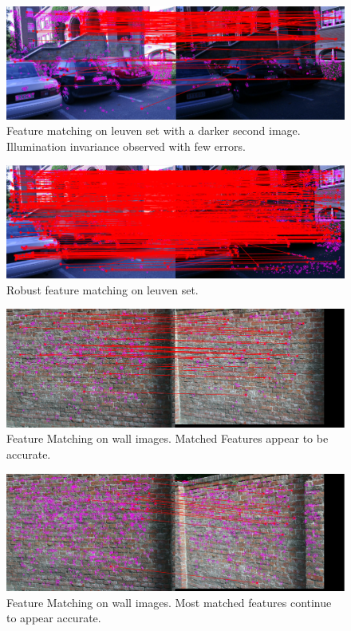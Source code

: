 \documentclass[12pt,journal,compsoc]{IEEEtran}
\begin{document}
\begin{figure}[h]
	\centering
		  \centering
		  \includegraphics[width=1\linewidth]{img/car2}
		  \caption{Feature matching on leuven set with a darker second image. Illumination invariance observed with few errors.}
		  \label{fig:car2}
\end{figure}

\begin{figure}[h]
	\centering
		  \centering
		  \includegraphics[width=1\linewidth]{img/car3}
		  \caption{Robust feature matching on leuven set.}
		  \label{fig:car3}
\end{figure}


\begin{figure}[h]
	\centering
		  \centering
		  \includegraphics[width=1\linewidth]{img/wall1}
		  \caption{Feature Matching on wall images. Matched Features appear to be accurate.}
		  \label{fig:wall1}
\end{figure}

\begin{figure}[h]
	\centering
		  \centering
		  \includegraphics[width=1\linewidth]{img/wall2}
		  \caption{Feature Matching on wall images. Most matched features continue to appear accurate.}
		  \label{fig:wall2}
\end{figure}
\end{document}
